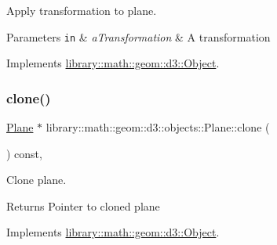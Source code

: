 Apply transformation to plane. 


\begin{DoxyParams}[1]{Parameters}
\mbox{\tt in}  & {\em a\+Transformation} & A transformation \\
\hline
\end{DoxyParams}


Implements \hyperlink{classlibrary_1_1math_1_1geom_1_1d3_1_1_object_a5fc47b1ee5d9a28efc6010d3d1512470}{library\+::math\+::geom\+::d3\+::\+Object}.

\mbox{\label{classlibrary_1_1math_1_1geom_1_1d3_1_1objects_1_1_plane_a0b6a4ae7bef06f3995f8fd9d32a88870}} 
\subsubsection{\texorpdfstring{clone()}{clone()}}
{\footnotesize\ttfamily \hyperlink{classlibrary_1_1math_1_1geom_1_1d3_1_1objects_1_1_plane}{Plane} $\ast$ library\+::math\+::geom\+::d3\+::objects\+::\+Plane\+::clone (\begin{DoxyParamCaption}{ }\end{DoxyParamCaption}) const\hspace{0.3cm}{\ttfamily [override]}, {\ttfamily [virtual]}}



Clone plane. 

\begin{DoxyReturn}{Returns}
Pointer to cloned plane 
\end{DoxyReturn}


Implements \hyperlink{classlibrary_1_1math_1_1geom_1_1d3_1_1_object_a1a784c6b359e0eb97cd34fabc42f2f3f}{library\+::math\+::geom\+::d3\+::\+Object}.

\mbox{\label{classlibrary_1_1math_1_1geom_1_1d3_1_1objects_1_1_plane_a7bb2f2a298461ee30c77ad653cfd195a}} 
